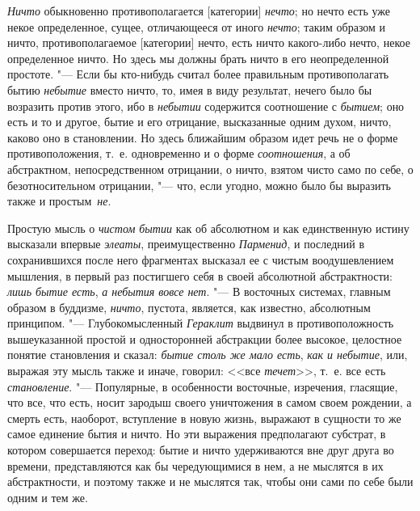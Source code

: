 {\em Ничто} обыкновенно противополагается [категории]
{\em нечто}; но нечто есть уже некое определенное,
сущее, отличающееся от иного {\em нечто}; таким
образом и ничто, противополагаемое [категории] нечто, есть ничто
какого-либо нечто, некое определенное ничто. Но здесь мы должны брать ничто
в его неопределенной простоте. "--- Если бы кто-нибудь считал более правильным
противополагать бытию {\em небытие} вместо ничто, то, имея
в виду результат, нечего было бы возразить против этого,
ибо в {\em небытии} содержится соотношение
с {\em бытием}; оно есть и то и другое, бытие и его
отрицание, высказанные одним духом, ничто, каково оно в становлении. Но
здесь ближайшим образом идет речь не о форме противоположения, т.~е.
одновременно и о форме {\em соотношения}, а об
абстрактном, непосредственном отрицании, о ничто, взятом чисто само по
себе, о безотносительном отрицании, "--- что, если угодно, можно было бы
выразить также и простым~{\em не}.

Простую мысль о {\em чистом бытии} как об абсолютном и
как единственную истину высказали впервые {\em элеаты},
преимущественно {\em Парменид}, и последний в
сохранившихся после него фрагментах высказал ее с чистым воодушевлением
мышления, в первый раз постигшего себя в своей абсолютной абстрактности:
{\em лишь бытие есть}, {\em а
небытия вовсе нет}. "--- В восточных системах, главным образом в буддизме,
{\em ничто}, пустота, является, как известно,
абсолютным принципом. "--- Глубокомысленный {\em Гераклит}
выдвинул в противоположность вышеуказанной простой и односторонней
абстракции более высокое, целостное понятие становления и сказал:
{\em бытие столь же мало есть},
{\em как и небытие}, или, выражая эту мысль также и
иначе, говорил: <<все {\em течет}>>, т.~е. все есть
{\em становление}. "--- Популярные, в особенности
восточные, изречения, гласящие, что все, что есть, носит зародыш своего
уничтожения в самом своем рождении, а смерть есть, наоборот, вступление в
новую жизнь, выражают в сущности то же самое единение бытия и ничто. Но эти
выражения предполагают субстрат, в котором совершается переход: бытие и
ничто удерживаются вне друг друга во времени, представляются как бы
чередующимися в нем, а не мыслятся в их абстрактности, и поэтому также и не
мыслятся так, чтобы они сами по себе были одним и тем же.

